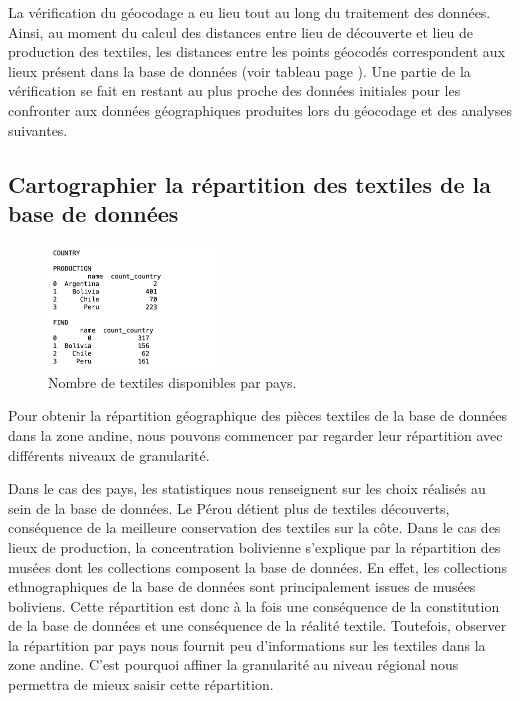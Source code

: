 La vérification du géocodage a eu lieu tout au long du traitement des données. Ainsi, au moment du calcul des distances entre lieu de découverte et lieu de production des textiles, les distances entre les points géocodés correspondent aux lieux présent dans la base de données (voir tableau page \pageref{fig:distancetab}). Une partie de la vérification se fait en restant au plus proche des données initiales pour les confronter aux données géographiques produites lors du géocodage et des analyses suivantes.

\subsection{Cartographier la répartition des textiles de la base de données}

\begin{figure}
    \centering
    \includegraphics[width=0.4\textwidth]{../images/count_country.png}
    \caption{Nombre de textiles disponibles par pays.}
    \label{fig:tab_count}
\end{figure}

Pour obtenir la répartition géographique des pièces textiles de la base de données dans la zone andine, nous pouvons commencer par regarder leur répartition avec différents niveaux de granularité.

Dans le cas des pays, les statistiques nous renseignent sur les choix réalisés au sein de la base de données. Le Pérou détient plus de textiles découverts, conséquence de la meilleure conservation des textiles sur la côte. Dans le cas des lieux de production, la concentration bolivienne s'explique par la répartition des musées dont les collections composent la base de données. En effet, les collections ethnographiques de la base de données sont principalement issues de musées boliviens. Cette répartition est donc à la fois une conséquence de la constitution de la base de données et une conséquence de la réalité textile. Toutefois, observer la répartition par pays nous fournit peu d'informations sur les textiles dans la zone andine. C'est pourquoi affiner la granularité au niveau régional nous permettra de mieux saisir cette répartition.

